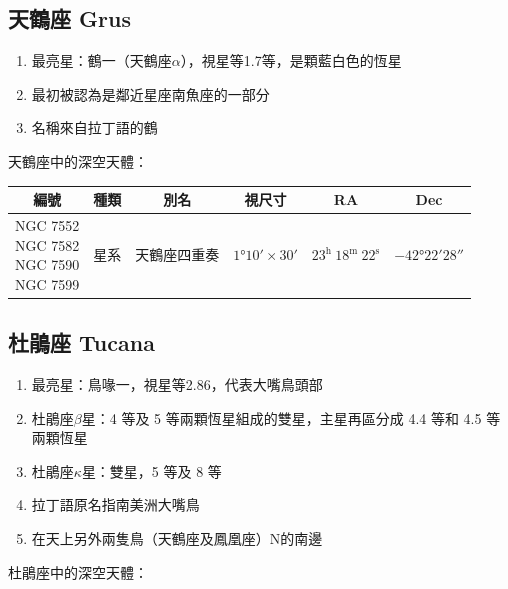 \subsection{天鶴座 Grus}
\begin{enumerate}
    \item 最亮星：鶴一（天鶴座\(\alpha\)），視星等1.7等，是顆藍白色的恆星
    \item 最初被認為是鄰近星座南魚座的一部分
    \item 名稱來自拉丁語的鶴
\end{enumerate}
天鶴座中的深空天體：
\newline

\begin{center}
\begin{longtable}{c | c | c | c | c | c}
    編號 & 種類 & 別名 & 視尺寸 & RA & Dec \\
    \hline
    \endfirsthead


    \endfoot

    \endlastfoot

    \makecell{NGC 7552\\NGC 7582\\NGC 7590\\NGC 7599} & 星系 & 天鶴座四重奏 & \(\ang{1;10;}\times\ang{;30;}\) & \(23^\text{h }18^\text{m }22^\text{s}\) & \(-\ang{42;22;28}\) \\ %
\end{longtable}
\end{center}

\subsection{杜鵑座 Tucana}
\begin{enumerate}
    \item 最亮星：鳥喙一，視星等2.86，代表大嘴鳥頭部
    \item 杜鵑座\(\beta\)星：4 等及 5 等兩顆恆星組成的雙星，主星再區分成 4.4 等和 4.5 等兩顆恆星
    \item 杜鵑座\(\kappa\)星：雙星，5 等及 8 等
    \item 拉丁語原名指南美洲大嘴鳥
    \item 在天上另外兩隻鳥（天鶴座及鳳凰座）N的南邊
\end{enumerate}
杜鵑座中的深空天體：
\newline

